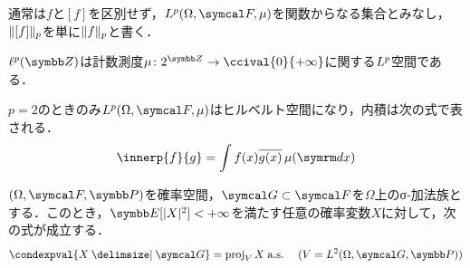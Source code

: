 \documentclass[../../main]{subfiles}
\begin{document}
通常は\(f\)と\([f]\)を区別せず，\(\Lebesgue{p}(\Omega,\sigmaalg{F},\mu)\)を関数からなる集合とみなし，\(\lVert[f]\rVert_p\)を単に\(\lVert f\rVert_p\)と書く．

\begin{example}
  \(\lebesgue{p}(\numset{Z})\)は計数測度\(\mu\colon\powerset{\numset{Z}}\to\ccival{0}{+\infty}\)に関する\(L^p\)空間である．
\end{example}

\begin{proposition}{}{}
  \(p=2\)のときのみ\(\Lebesgue{p}(\Omega,\sigmaalg{F},\mu)\)はヒルベルト空間になり，内積は次の式で表される．
  \[
    \innerp{f}{g} = \int f(x)\conj*{g(x)}\measured[x]{\mu}
  \]
\end{proposition}

\begin{proposition}{}{}
  \((\Omega,\sigmaalg{F},\prob)\)を確率空間，\(\sigmaalg{G}\subset\sigmaalg{F}\)を\(\Omega\)上のσ‐加法族とする．このとき，\(\expval[\abs{X}^2]<+\infty\)を満たす任意の確率変数\(X\)に対して，次の式が成立する．
  \[
    \condexpval{X\given\sigmaalg{G}} = \proj_VX\almostsurely\quad(V=\Lebesgue{2}(\Omega,\sigmaalg{G},\prob))
  \]
\end{proposition}
\end{document}
